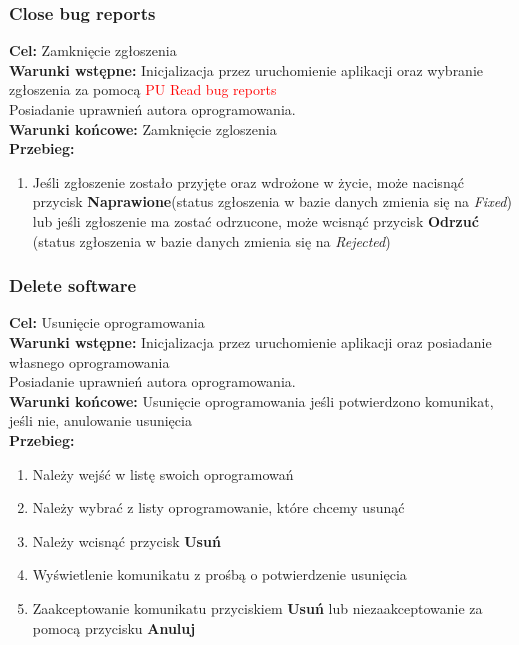 \documentclass[12pt,a4paper]{article}
\begin{document}
\subsubsection{Close bug reports}
\textbf{Cel: } Zamknięcie zgłoszenia \\
\textbf{Warunki wstępne:} Inicjalizacja przez uruchomienie aplikacji oraz wybranie zgłoszenia za pomocą \textcolor{red}{PU Read bug reports}\\ Posiadanie uprawnień autora oprogramowania.\\
\textbf{Warunki końcowe:} Zamknięcie zgloszenia\\
\textbf{Przebieg:}
\begin{enumerate}
    \item Jeśli zgłoszenie zostało przyjęte oraz wdrożone w życie, może nacisnąć przycisk \textbf{Naprawione}(status zgłoszenia w bazie danych zmienia się na \textit{Fixed}) lub jeśli zgłoszenie ma zostać odrzucone, może wcisnąć przycisk \textbf{Odrzuć} (status zgłoszenia w bazie danych zmienia się na \textit{Rejected})
\end{enumerate}

\subsubsection{Delete software}
\textbf{Cel: } Usunięcie oprogramowania \\
\textbf{Warunki wstępne:} Inicjalizacja przez uruchomienie aplikacji oraz posiadanie własnego oprogramowania\\ Posiadanie uprawnień autora oprogramowania.\\
\textbf{Warunki końcowe:} Usunięcie oprogramowania jeśli potwierdzono komunikat, jeśli nie, anulowanie usunięcia\\
\textbf{Przebieg:}
\begin{enumerate}
    \item Należy wejść w listę swoich oprogramowań
    \item Należy wybrać z listy oprogramowanie, które chcemy usunąć
    \item Należy wcisnąć przycisk \textbf{Usuń}
    \item Wyświetlenie komunikatu z prośbą o potwierdzenie usunięcia
    \item Zaakceptowanie komunikatu przyciskiem \textbf{Usuń} lub niezaakceptowanie za pomocą przycisku \textbf{Anuluj}
\end{enumerate}
\end{document}
